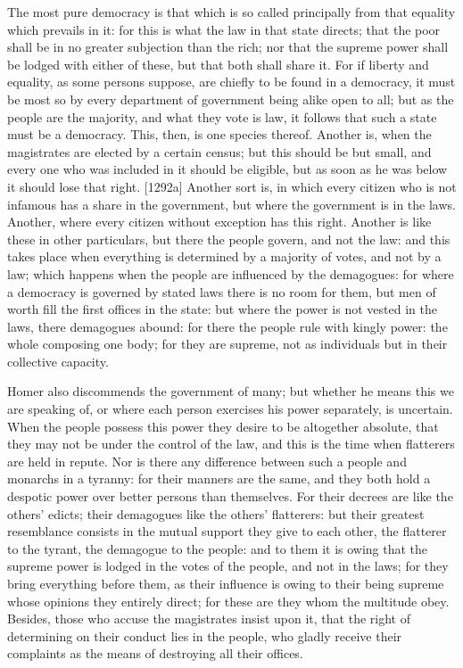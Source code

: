 The most pure democracy is that which is so called principally from that
equality which prevails in it: for this is what the law in that state
directs; that the poor shall be in no greater subjection than the rich;
nor that the supreme power shall be lodged with either of these, but that
both shall share it. For if liberty and equality, as some persons suppose,
are chiefly to be found in a democracy, it must be most so by every
department of government being alike open to all; but as the people are
the majority, and what they vote is law, it follows that such a state must
be a democracy. This, then, is one species thereof. Another is, when the
magistrates are elected by a certain census; but this should be but small,
and every one who was included in it should be eligible, but as soon as he
was below it should lose that right. [1292a] Another sort is, in which
every citizen who is not infamous has a share in the government, but where
the government is in the laws. Another, where every citizen without
exception has this right. Another is like these in other particulars, but
there the people govern, and not the law: and this takes place when
everything is determined by a majority of votes, and not by a law; which
happens when the people are influenced by the demagogues: for where a
democracy is governed by stated laws there is no room for them, but men of
worth fill the first offices in the state: but where the power is not
vested in the laws, there demagogues abound: for there the people rule
with kingly power: the whole composing one body; for they are supreme, not
as individuals but in their collective capacity.

Homer also discommends the government of many; but whether he means this
we are speaking of, or where each person exercises his power separately,
is uncertain. When the people possess this power they desire to be
altogether absolute, that they may not be under the control of the law,
and this is the time when flatterers are held in repute. Nor is there any
difference between such a people and monarchs in a tyranny: for their
manners are the same, and they both hold a despotic power over better
persons than themselves. For their decrees are like the others' edicts;
their demagogues like the others' flatterers: but their greatest
resemblance consists in the mutual support they give to each other, the
flatterer to the tyrant, the demagogue to the people: and to them it is
owing that the supreme power is lodged in the votes of the people, and not
in the laws; for they bring everything before them, as their influence is
owing to their being supreme whose opinions they entirely direct; for
these are they whom the multitude obey. Besides, those who accuse the
magistrates insist upon it, that the right of determining on their conduct
lies in the people, who gladly receive their complaints as the means of
destroying all their offices.

